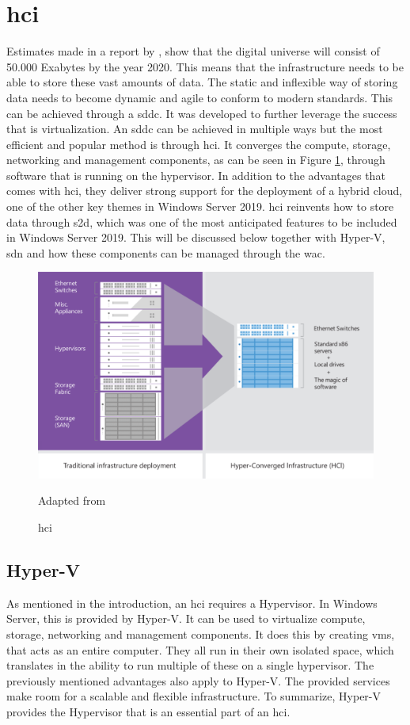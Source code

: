\section{\acrfull{hci}}
Estimates made in a report by \textcite{Gantz2012}, show that the digital universe will consist of 50.000 Exabytes by the year 2020. This means that the infrastructure needs to be able to store these vast amounts of data. The static and inflexible way of storing data needs to become dynamic and agile to conform to modern standards. This can be achieved through a \acrfull{sddc}. It was developed to further leverage the success that is virtualization. An \acrshort{sddc} can be achieved in multiple ways but the most efficient and popular method is through \acrshort{hci}. It converges the compute, storage, networking and management components, as can be seen in Figure \ref{fig:HCI}, through software that is running on the hypervisor. In addition to the advantages that comes with \acrshort{hci}, they deliver strong support for the deployment of a hybrid cloud, one of the other key themes in Windows Server 2019. 
\acrshort{hci} reinvents how to store data through \acrshort{s2d}, which was one of the most anticipated features to be included in Windows Server 2019. This will be discussed below together with Hyper-V, \acrshort{sdn} and how these components can be managed through the \acrlong{wac}. \autocite{Haag2016}
\begin{figure}[h]
	\includegraphics[width=0.8\linewidth]{img/StandVanZaken/HCI.png}
	\captionsetup{width=0.6\linewidth}
	\centering		
	\caption[\acrshort{hci}]{\acrfull{hci}}
	\scriptsize	
	Adapted from \cite{Woolslayer2018}
	\label{fig:HCI}
\end{figure}

\subsection{Hyper-V}
As mentioned in the introduction, an \acrshort{hci} requires a Hypervisor. In Windows Server, this is provided by Hyper-V. It can be used to virtualize compute, storage, networking and management components.  It does this by creating \acrshort{vm}s, that acts as an entire computer. They all run in their own isolated space, which translates in the ability to run multiple of these on a single hypervisor. The previously mentioned advantages also apply to Hyper-V. The provided services make room for a scalable and flexible infrastructure. To summarize, Hyper-V provides the Hypervisor that is an essential part of an \acrshort{hci}. \autocite{Short2016}

